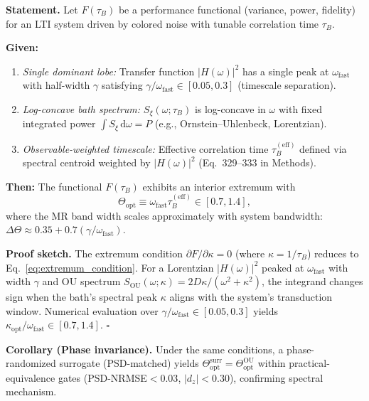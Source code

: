 \documentclass[11pt,letterpaper]{article}
\begin{document}
\begin{tcolorbox}[colback=blue!5!white,colframe=blue!75!black,title=Theorem: Memory-Resonance Condition (MRC) for Class~S Systems]

\textbf{Statement.} Let $F(\tau_B)$ be a performance functional (variance, power, fidelity) for an LTI system driven by colored noise with tunable correlation time $\tau_B$.

\textbf{Given:}
\begin{enumerate}[nosep,leftmargin=*]
\item \emph{Single dominant lobe:} Transfer function $|H(\omega)|^2$ has a single peak at $\omega_{\mathrm{fast}}$ with half-width $\gamma$ satisfying $\gamma/\omega_{\mathrm{fast}} \in [0.05, 0.3]$ (timescale separation).
\item \emph{Log-concave bath spectrum:} $S_\xi(\omega;\tau_B)$ is log-concave in $\omega$ with fixed integrated power $\int S_\xi\,\mathrm{d}\omega = P$ (e.g., Ornstein--Uhlenbeck, Lorentzian).
\item \emph{Observable-weighted timescale:} Effective correlation time $\tau_B^{(\mathrm{eff})}$ defined via spectral centroid weighted by $|H(\omega)|^2$ (Eq.~329--333 in Methods).
\end{enumerate}

\textbf{Then:} The functional $F(\tau_B)$ exhibits an interior extremum with
\begin{equation}
\Theta_{\mathrm{opt}} \equiv \omega_{\mathrm{fast}}\tau_B^{(\mathrm{eff})} \in [0.7, 1.4],
\end{equation}
where the MR band width scales approximately with system bandwidth: $\Delta\Theta \approx 0.35 + 0.7(\gamma/\omega_{\mathrm{fast}})$.

\textbf{Proof sketch.} The extremum condition $\partial F/\partial\kappa = 0$ (where $\kappa=1/\tau_B$) reduces to Eq.~\eqref{eq:extremum_condition}. For a Lorentzian $|H(\omega)|^2$ peaked at $\omega_{\mathrm{fast}}$ with width $\gamma$ and OU spectrum $S_{\text{OU}}(\omega;\kappa)=2D\kappa/(\omega^2+\kappa^2)$, the integrand changes sign when the bath's spectral peak $\kappa$ aligns with the system's transduction window. Numerical evaluation over $\gamma/\omega_{\mathrm{fast}}\in[0.05,0.3]$ yields $\kappa_{\mathrm{opt}}/\omega_{\mathrm{fast}}\in[0.7,1.4]$. \hfill$\square$

\textbf{Corollary (Phase invariance).} Under the same conditions, a phase-randomized surrogate (PSD-matched) yields $\Theta_{\mathrm{opt}}^{\mathrm{surr}} = \Theta_{\mathrm{opt}}^{\mathrm{OU}}$ within practical-equivalence gates (PSD-NRMSE$<0.03$, $|d_z|<0.30$), confirming spectral mechanism.

\end{tcolorbox}
\end{document}
